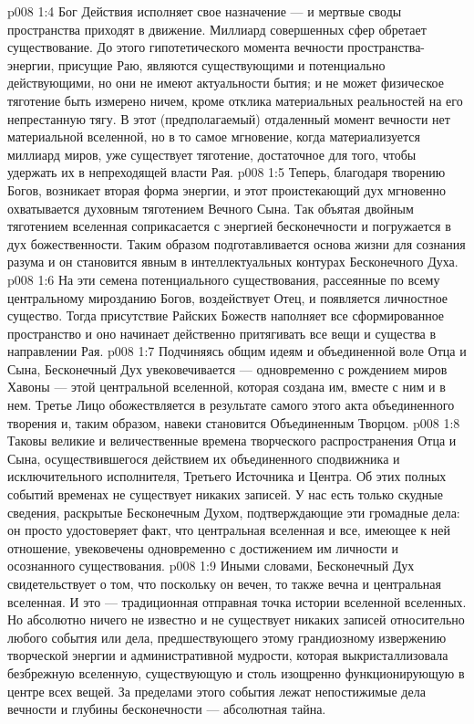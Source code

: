 \vs p008 1:4 \pc Бог Действия исполняет свое назначение --- и мертвые своды пространства приходят в движение. Миллиард совершенных сфер обретает существование. До этого гипотетического момента вечности пространства\hyp{}энергии, присущие Раю, являются существующими и потенциально действующими, но они не имеют актуальности бытия; и не может физическое тяготение быть измерено ничем, кроме отклика материальных реальностей на его непрестанную тягу. В этот (предполагаемый) отдаленный момент вечности нет материальной вселенной, но в то самое мгновение, когда материализуется миллиард миров, уже существует тяготение, достаточное для того, чтобы удержать их в непреходящей власти Рая.
\vs p008 1:5 Теперь, благодаря творению Богов, возникает вторая форма энергии, и этот проистекающий дух мгновенно охватывается духовным тяготением Вечного Сына. Так объятая двойным тяготением вселенная соприкасается с энергией бесконечности и погружается в дух божественности. Таким образом подготавливается основа жизни для сознания разума и он становится явным в интеллектуальных контурах Бесконечного Духа.
\vs p008 1:6 На эти семена потенциального существования, рассеянные по всему центральному мирозданию Богов, воздействует Отец, и появляется личностное существо. Тогда присутствие Райских Божеств наполняет все сформированное пространство и оно начинает действенно притягивать все вещи и существа в направлении Рая.
\vs p008 1:7 \pc Подчиняясь общим идеям и объединенной воле Отца и Сына, Бесконечный Дух увековечивается --- одновременно с рождением миров Хавоны --- этой центральной вселенной, которая создана им, вместе с ним и в нем. Третье Лицо обожествляется в результате самого этого акта объединенного творения и, таким образом, навеки становится Объединенным Творцом.
\vs p008 1:8 \pc Таковы великие и величественные времена творческого распространения Отца и Сына, осуществившегося действием их объединенного сподвижника и исключительного исполнителя, Третьего Источника и Центра. Об этих полных событий временах не существует никаких записей. У нас есть только скудные сведения, раскрытые Бесконечным Духом, подтверждающие эти громадные дела: он просто удостоверяет факт, что центральная вселенная и все, имеющее к ней отношение, увековечены одновременно с достижением им личности и осознанного существования.
\vs p008 1:9 Иными словами, Бесконечный Дух свидетельствует о том, что поскольку он вечен, то также вечна и центральная вселенная. И это --- традиционная отправная точка истории вселенной вселенных. Но абсолютно ничего не известно и не существует никаких записей относительно любого события или дела, предшествующего этому грандиозному извержению творческой энергии и административной мудрости, которая выкристаллизовала безбрежную вселенную, существующую и столь изощренно функционирующую в центре всех вещей. За пределами этого события лежат непостижимые дела вечности и глубины бесконечности --- абсолютная тайна.
